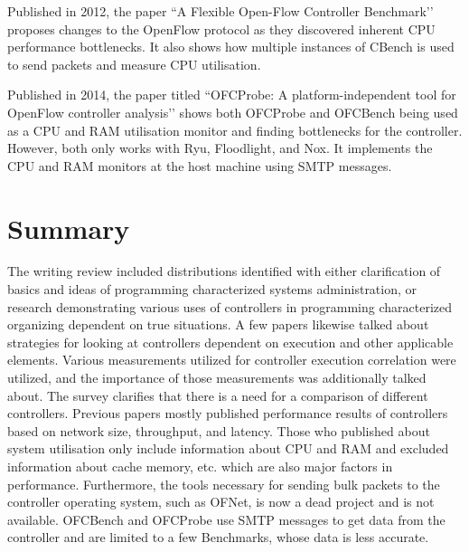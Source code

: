 Published in 2012, the paper ``A Flexible Open-Flow Controller Benchmark’’ \cite{flexible} proposes changes to the OpenFlow protocol as they discovered inherent CPU performance bottlenecks. It also shows how multiple instances of CBench is used to send packets and measure CPU utilisation.

Published in 2014, the paper titled ``OFCProbe: A platform-independent tool for OpenFlow controller analysis’’ \cite{ofcprobe} shows both OFCProbe and OFCBench being used as a CPU and RAM utilisation monitor and finding bottlenecks for the controller. However, both only works with Ryu, Floodlight, and Nox. It implements the CPU and RAM monitors at the host machine using SMTP messages.

\section*{Summary}
The writing review included distributions identified with either clarification of basics and ideas of programming characterized systems administration, or research demonstrating various uses of controllers in programming characterized organizing dependent on true situations. A few papers likewise talked about strategies for looking at controllers dependent on execution and other applicable elements. Various measurements utilized for controller execution correlation were utilized, and the importance of those measurements was additionally talked about. The survey clarifies that there is a need for a comparison of different controllers. Previous papers mostly published performance results of controllers based on network size, throughput, and latency. Those who published about system utilisation only include information about CPU and RAM and excluded information about cache memory, etc. which are also major factors in performance. Furthermore, the tools necessary for sending bulk packets to the controller operating system, such as OFNet, is now a dead project and is not available. OFCBench and OFCProbe use SMTP messages to get data from the controller and are limited to a few Benchmarks, whose data is less accurate.